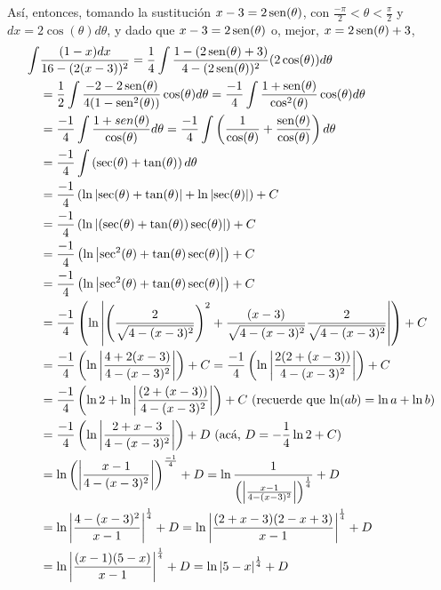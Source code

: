 Así, entonces, tomando la sustitución $x-3=2\operatorname{sen}(\theta )$, con $\frac{-\pi }{2}< \theta < \frac{\pi }{2}$ y $dx=2\cos (\theta)d\theta$, y dado que $x-3=2\operatorname{sen}(\theta )$ o, mejor, $x=2\operatorname{sen}(\theta )+3$,
\begin{gather*}
\begin{aligned}
  \int& \frac{(1-x)dx}{16-(2(x-3))^{2}}=\frac{1}{4}\int \frac{
  1-(2\sen(\theta )+3)}{4-(2\sen(\theta ))^{2}}(2\cos (\theta ))d\theta\\
  &=\frac{1}{2}\int \frac{-2-2\sen(\theta )}{4(1-\sen^{2}(\theta ))}\cos (\theta )d\theta=\frac{-1}{4}\int \frac{1+\sen(\theta )}{\cos^{2}(\theta )}\cos (\theta )d\theta\\
  &=\frac{-1}{4}\int \frac{1+sen(\theta )}{\cos
  (\theta )}d\theta
  =\frac{-1}{4}\int \left( \frac{1}{\cos (\theta )}+
  \frac{\sen(\theta )}{\cos (\theta )}\right) d\theta\\
  &=\frac{-1}{4}\int \left( \sec (\theta )+\tan (\theta)\right) d\theta\\
  &=\frac{-1}{4}\left( \ln \left\vert \sec (\theta)+\tan (\theta )\right\vert +\ln \left\vert \sec (\theta )\right\vert\right) +C\\
  &=\frac{-1}{4}\left( \ln \left\vert (\sec (\theta
  )+\tan (\theta ))\sec (\theta )\right\vert \right) +C\\
  &=\frac{-1}{4}\left( \ln \left\vert \sec ^{2}(\theta)+\tan (\theta )\sec (\theta )\right\vert \right) +C\\
  &=\frac{-1}{4}\left( \ln \left\vert \sec ^{2}(\theta )+\tan (\theta )\sec (\theta )\right\vert \right) +C \\
  & =\frac{-1}{4}\left( \ln \left\vert \left( \frac{%
    2}{\sqrt{4-(x-3)^{2}}}\right) ^{2}+\frac{(x-3)}{\sqrt{4-(x-3)^{2}}}%
  \frac{2}{\sqrt{4-(x-3)^{2}}} \right\vert \right) +C\\
  &=\frac{-1}{4}\left( \ln \left\vert \frac{4+2(x-3)}{
  4-(x-3)^{2}}\right\vert \right) +C=\frac{-1}{4}\left( \ln \left\vert \frac{%
  2(2+(x-3))}{4-(x-3)^{2}}\right\vert \right) +C\\
  &=\frac{-1}{4}\left(\ln 2+\ln \left\vert \frac{(2+(x-3))}{4-(x-3)^{2}}\right\vert \right) +C\ (\text{recuerde que $\ln(ab)=\ln a+\ln b$})\\
  &=\frac{-1}{4}\left( \ln \left\vert \frac{2+x-3}{%
  4-(x-3)^{2}}\right\vert \right) +D\ (\text{acá, $D=-\frac{1}{4}\ln2+C$})\\
  &=\ln \left( \left\vert \frac{x-1}{4-(x-3)^{2}}\right\vert \right) ^{\frac{-1}{4}}+D=\ln \frac{1}{\left( \left\vert \frac{x-1}{4-(x-3)^{2}}\right\vert \right) ^{\frac{1}{4}}}+D\\
  &=\ln \left\vert \frac{4-(x-3)^{2}}{x-1}\right\vert ^{%
  \frac{1}{4}}+D=\ln \left\vert \frac{(2+x-3)(2-x+3)}{x-1}\right\vert
  ^{\frac{1}{4}}+D\\
  &=\ln \left\vert \frac{(x-1)(5-x)}{x-1}\right\vert ^{\frac{1}{4}}+D
  =\ln \left\vert 5-x\right\vert ^{\frac{1}{4}}+D
\end{aligned}
\end{gather*}

